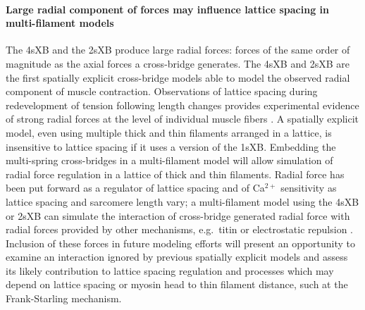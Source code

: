 \documentclass[]{article}
\begin{document}
\paragraph{Large radial component of forces may influence lattice spacing in multi-filament models} %
The 4sXB and the 2sXB produce large radial forces: forces of the same order of magnitude as the axial forces a cross-bridge generates. 
The 4sXB and 2sXB are the first spatially explicit cross-bridge models able to model the observed radial component of muscle contraction.
Observations of lattice spacing during redevelopment of tension following length changes provides experimental evidence of strong radial forces at the level of individual muscle fibers \citep{Cecchi1990}. %
A spatially explicit model, even using multiple thick and thin filaments arranged in a lattice, is insensitive to lattice spacing if it uses a version of the 1sXB\@.
Embedding the multi-spring cross-bridges in a multi-filament model will allow simulation of radial force regulation in a lattice of thick and thin filaments.  
Radial force has been put forward as a regulator of lattice spacing and of Ca$^{2+}$ sensitivity as lattice spacing and sarcomere length vary; a multi-filament model using the 4sXB or 2sXB can simulate the interaction of cross-bridge generated radial force with radial forces provided by other mechanisms, e.g.\ titin or electrostatic repulsion \citep{Martyn2004, Cazorla2001, Millman1998}. 
Inclusion of these forces in future modeling efforts will present an opportunity to examine an interaction ignored by previous spatially explicit models and assess its likely contribution to lattice spacing regulation and processes which may depend on lattice spacing or myosin head to thin filament distance, such at the Frank-Starling mechanism. 
\end{document}
